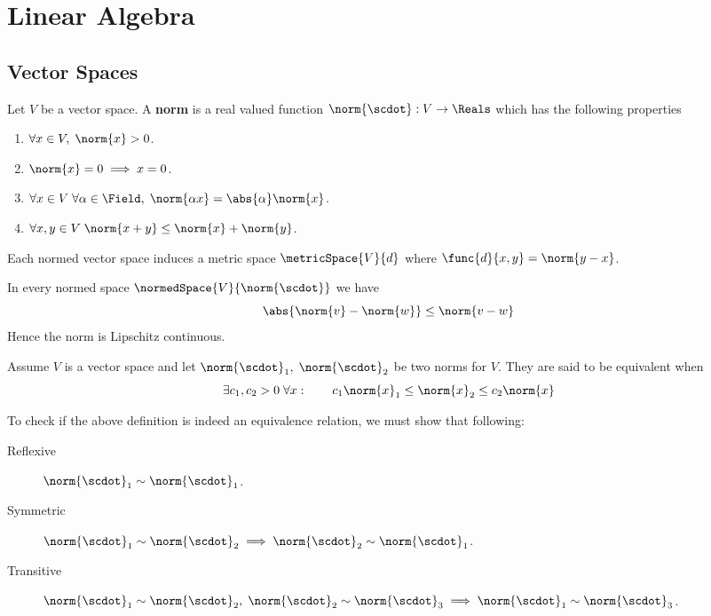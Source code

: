 \section{Linear Algebra}
\subsection{Vector Spaces}

\begin{definition}
    Let \(V\) be a vector space. A \textbf{norm} is a real valued function \(\norm{ \scdot }: V \to \Reals\) which has the following properties
    \begin{enumerate}
        \item \(\forall x \in V, \; \norm{x} > 0\).
        \item \(\norm{x} = 0 \implies x = 0\).
        \item \(\forall x \in V \; \forall \alpha \in \Field, \; \norm{\alpha x} = \abs{\alpha} \norm{x}\).
        \item \(\forall x,y \in V \; \norm{x+y} \leq \norm{x} + \norm{y}\).
    \end{enumerate}
\end{definition}

Each normed vector space induces a metric space \(\metricSpace{V}{d}\) where \(\func{d}{x,y} = \norm{y - x}\).

\begin{theorem}
    In every normed space \(\normedSpace{V}{\norm{\scdot}}\) we have
    \begin{equation*}
        \abs{ {\norm{v} - \norm{w}}} \leq \norm{v - w}
    \end{equation*}
    Hence the norm is Lipschitz continuous.
\end{theorem}


\begin{definition}
    Assume \(V\) is a vector space and let \(\norm{\scdot}_1, \; \norm{\scdot}_2\) be two norms for \(V\). They are said to be equivalent when
    \begin{equation*}
        \exists c_1,c_2 > 0 \; \forall x : \qquad c_1 \norm{x}_1 \leq \norm{x}_2 \leq c_2 \norm{x}
    \end{equation*}
\end{definition}

To check if the above definition is indeed an equivalence relation, we must show that following:
\begin{description}
    \item [Reflexive] \(\norm{\scdot}_1 \sim \norm{\scdot}_1\).
    \item [Symmetric] \(\norm{\scdot}_1 \sim \norm{\scdot}_2 \implies \norm{\scdot}_2 \sim \norm{\scdot}_1\).
    \item [Transitive] \( \norm{\scdot}_1 \sim \norm{\scdot}_2 , \; \norm{\scdot}_2 \sim \norm{\scdot}_3 \implies \norm{\scdot}_1 \sim \norm{\scdot}_3\).
\end{description}

